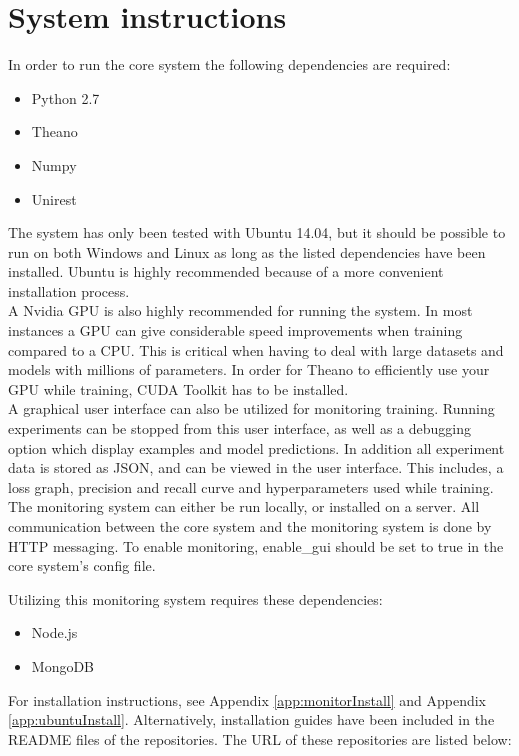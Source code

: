 \section{System instructions}
\label{app:system_instructions}
In order to run the core system the following dependencies are required:
\begin{itemize}
\item Python 2.7
\item Theano
\item Numpy
\item Unirest
\end{itemize}

The system has only been tested with Ubuntu 14.04, but it should be possible to run on both Windows and Linux as long as the listed dependencies have been installed. Ubuntu is highly recommended because of a more convenient installation process. \\

A Nvidia GPU is also highly recommended for running the system. In most instances a GPU can give considerable speed improvements when training compared to a CPU. This is critical when having to deal with large datasets and models with millions of parameters. In order for Theano to efficiently use your GPU while training, CUDA Toolkit has to be installed. \\

A graphical user interface can also be utilized for monitoring training. Running experiments can be stopped from this user interface, as well as a debugging option which display examples and model predictions. In addition all experiment data is stored as JSON, and can be viewed in the user interface. This includes, a loss graph, precision and recall curve and hyperparameters used while training. \\

The monitoring system can either be run locally, or installed on a server. All communication between the core system and the monitoring system is done by HTTP messaging. To enable monitoring, enable\_gui should be set to true in the core system's config file.

Utilizing this monitoring system requires these dependencies:
\begin{itemize}
\item Node.js
\item MongoDB
\end{itemize}

For installation instructions, see Appendix \ref{app:monitorInstall} and Appendix \ref{app:ubuntuInstall}. Alternatively, installation guides have been included in the README files of the repositories. The URL of these repositories are listed below:

